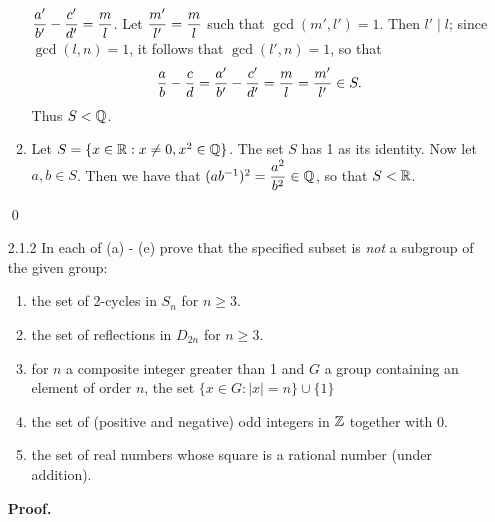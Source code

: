 \begin{enumerate}
\begin{enumerate}
               $\displaystyle\frac{a'}{b'} - \frac{c'}{d'} = \frac{m}{l}$. Let
               $\displaystyle\frac{m'}{l'} = \frac{m}{l}$ such that $\gcd(m', l') = 1$.
               Then $l' \mid l$; since $\gcd(l,n)=1$, it follows that
               $\gcd(l',n)=1$, so that
               $$\frac{a}{b}-\frac{c}{d}=\displaystyle\frac{a'}{b'}-\frac{c'}{d'} =
                 \frac{m}{l} =\frac{m'}{l'} \in S.$$ Thus $S < \mathbb{Q}$.
         \item Let $S = \{x \in \mathbb{R} : x \neq 0, x^2 \in \mathbb{Q}\}$. The set $S$
               has 1 as its identity. Now let $a, b \in S$. Then we have that
               $(ab^{-1})^2 = \displaystyle\frac{a^2}{b^2} \in \mathbb{Q}$, so that $S < \mathbb{R}$.
      \end{enumerate} \qed
   \item[2.1.2]   In each of (a) - (e) prove that the specified subset is
                  \textit{not} a subgroup of the given group:
                  \begin{enumerate}
                     \item the set of 2-cycles in $S_n$ for $n \ge 3$.
                     \item the set of reflections in $D_{2n}$ for $n \ge 3$.
                     \item for $n$ a composite integer greater than 1 and $G$ a
                           group containing an element of order $n$, the set
                           $\{x \in G : |x| = n\} \cup \{1\}$
                     \item the set of (positive and negative) odd integers in
                           $\mathbb{Z}$ together with 0.
                     \item the set of real numbers whose square is a rational
                           number (under addition).
                  \end{enumerate}

      \textbf{Proof.}


\end{enumerate}
